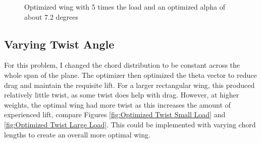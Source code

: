 \documentclass{article}
\begin{document}
\begin{figure}[h]
\begin{minipage}[b]{0.45\textwidth}
\caption{Optimized wing with 5 times the load and an optimized alpha of about 7.2 degrees}
\label{fig:Optimized Alpha Large Load}
\end{minipage}
\end{figure}

\subsection{Varying Twist Angle}
For this problem, I changed the chord distribution to be constant across the whole span of the plane. The optimizer then optimized the theta vector to reduce drag and maintain the requisite lift. For a larger rectangular wing, this produced relatively little twist, as some twist does help with drag. However, at higher weights, the optimal wing had more twist as this increases the amount of experienced lift, compare Figures \ref{fig:Optimized Twist Small Load} and \ref{fig:Optimized Twist Large Load}. This could be implemented with varying chord lengths to create an overall more optimal wing.
\end{document}
